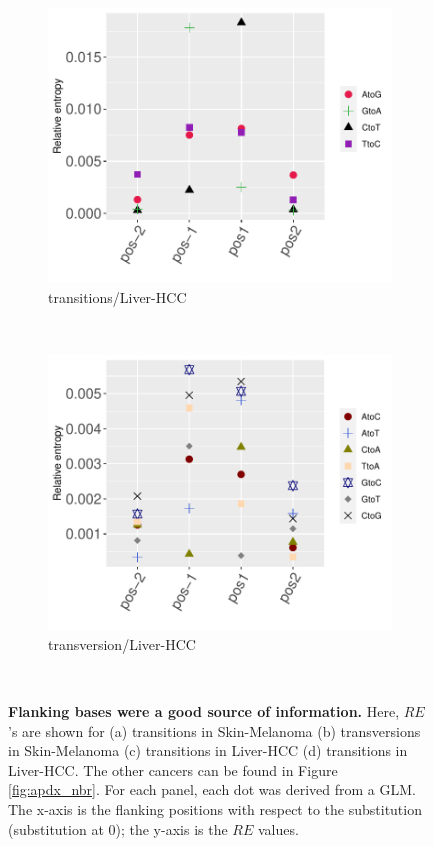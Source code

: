\begin{figure}[ht!]
    \begin{subfigure}{.5\textwidth}
    \includegraphics[scale=0.63]{graphics/nbr_transitions_Liver-HCC.pdf}
    \caption{transitions/Liver-HCC}
    \label{fig:transitions_liver}
    \end{subfigure}
    ~
    \begin{subfigure}{.5\textwidth}
    \includegraphics[scale=0.63]{graphics/nbr_transversion_Liver-HCC.pdf}
    \caption{transversion/Liver-HCC}
    \label{fig:transversion_liver}
    \end{subfigure} \\
    \caption{\textbf{Flanking bases were a good source of information.} Here, $RE$'s are shown for (a) transitions in Skin-Melanoma (b) transversions in Skin-Melanoma (c) transitions in Liver-HCC (d) transitions in Liver-HCC. The other cancers can be found in Figure \ref{fig:apdx_nbr}. For each panel, each dot was derived from a GLM. The x-axis is the flanking positions with respect to the substitution (substitution at 0); the y-axis is the $RE$ values.}
    \label{fig:nbr}
\end{figure}